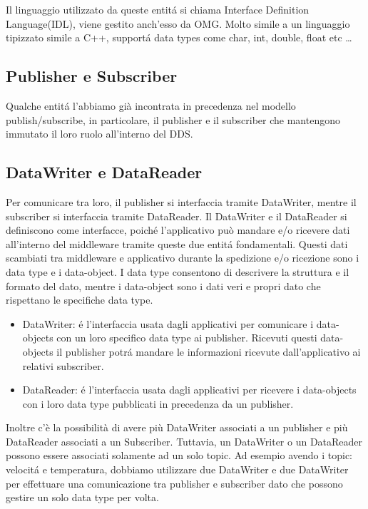 Il linguaggio utilizzato da queste entitá si chiama Interface 
Definition Language(IDL),
viene gestito anch'esso da OMG. Molto simile a un linguaggio tipizzato 
simile a C++, supportá data types come char, int, double, float etc
\cite{1494965} \dots


\subsection{Publisher e Subscriber}

Qualche entitá l'abbiamo già incontrata
in precedenza nel modello publish/subscribe, in particolare, il publisher e 
il subscriber che mantengono immutato il loro ruolo all'interno del DDS.

\subsection{DataWriter e DataReader}

Per comunicare tra loro, il publisher si interfaccia tramite
DataWriter, 
mentre il subscriber si interfaccia tramite DataReader.
Il DataWriter e il DataReader si definiscono come interfacce, 
poiché l'applicativo
può mandare e/o ricevere dati all'interno del middleware
tramite queste due entitá fondamentali. 
Questi dati scambiati tra middleware e applicativo durante la spedizione e/o 
ricezione sono i data type e i data-object. I data type consentono di 
descrivere la struttura e il formato del dato, mentre i data-object
sono i dati veri e propri dato che rispettano le specifiche data type.
\begin{itemize}
    \item DataWriter: é l'interfaccia usata dagli applicativi 
    per comunicare i
    data-objects con un loro specifico data type ai publisher.
    Ricevuti questi data-objects il publisher potrá mandare le
    informazioni ricevute dall'applicativo ai relativi subscriber.
    \item DataReader: é l'interfaccia usata dagli applicativi per
    ricevere i data-objects con i loro data type pubblicati in
    precedenza da un publisher.
\end{itemize}\cite{dds1.4}
Inoltre c'è la possibilità di avere 
più DataWriter associati a un publisher e più DataReader associati a 
un Subscriber. Tuttavia, un DataWriter o un DataReader possono essere 
associati solamente ad un solo topic.
Ad esempio avendo i topic: velocitá e temperatura, dobbiamo utilizzare
due DataWriter e due DataWriter per effettuare una comunicazione tra
publisher e subscriber dato che possono gestire un solo data type per volta.


